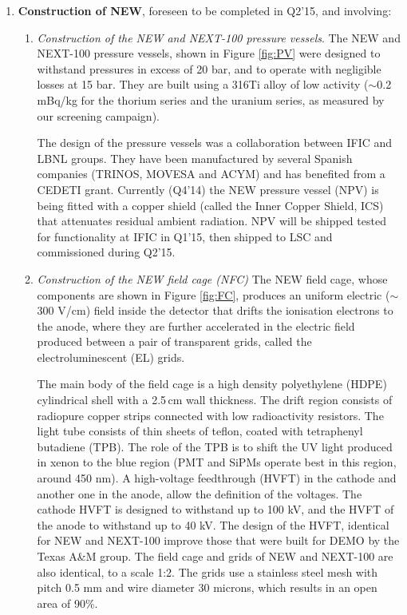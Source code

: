 \begin{enumerate}
\item {\bf Construction of NEW}, foreseen to be completed in Q2'15, and involving:
\begin{enumerate}
\item {\em Construction of the NEW and NEXT-100 pressure vessels}.
The NEW and NEXT-100 pressure vessels, shown in Figure \ref{fig:PV} were designed to withstand pressures in excess of 20 bar, and to operate with negligible losses at 15 bar. They are built using a 316Ti alloy of low activity ($\sim$0.2 mBq/kg for the thorium series and the uranium series, as measured by our screening campaign). 

The design of the pressure vessels was a collaboration between IFIC and LBNL groups. They have been manufactured by several Spanish companies (TRINOS, MOVESA and ACYM) and has benefited from a CEDETI grant. Currently (Q4'14) the NEW pressure vessel (NPV) is being fitted with a copper shield (called the Inner Copper Shield, ICS) that attenuates residual ambient radiation. NPV will be shipped tested for functionality at IFIC in Q1'15, then shipped to LSC and commissioned during Q2'15. 

\item {\em Construction of the NEW field cage (NFC)}
The NEW field cage, whose components are shown in Figure \ref{fig:FC}, produces an uniform electric ($\sim$ 300 V/cm) field inside the  detector that drifts the ionisation electrons to the anode, where they are further accelerated in the electric field produced between a pair of transparent grids, called the electroluminescent (EL) grids. 

The main body of the field cage is a high density polyethylene (HDPE) cylindrical shell with a 2.5\,cm wall thickness.  The drift region consists of radiopure  copper strips connected with low radioactivity resistors.  The light tube consists of thin sheets of teflon, coated with tetraphenyl butadiene (TPB). The role of the TPB is to shift the UV light produced in xenon to the blue region (PMT and SiPMs operate best in this region, around 450 nm).  A high-voltage feedthrough (HVFT) in the cathode and another one in the anode, allow the definition of the voltages. The cathode HVFT is designed to withstand up to 100 kV, and the HVFT of the anode to withstand up to 40 kV. The design of the HVFT, identical for NEW and NEXT-100 improve those that were built for DEMO by the Texas A\&M group. The field cage and grids of NEW and NEXT-100 are also identical, to a scale 1:2. The grids use a stainless steel mesh with pitch 0.5 mm and wire diameter 30 microns, which results in an open area of 90\%. 


\end{enumerate}
\end{enumerate}
